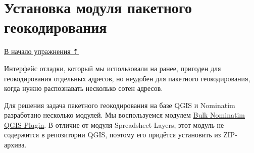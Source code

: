 \documentclass[
  12pt,
]{book}
\begin{document}
\hypertarget{geocoding-batch-install}{%
\section{Установка модуля пакетного геокодирования}\label{geocoding-batch-install}}

\protect\hyperlink{geocoding}{В начало упражнения ⇡}

Интерфейс отладки, который мы использовали на ранее, пригоден для геокодирования отдельных адресов, но неудобен для пакетного геокодирования, когда нужно распознавать несколько сотен адресов.

Для решения задача пакетного геокодирования на базе QGIS и Nominatim разработано несколько модулей. Мы воспользуемся модулем \href{https://github.com/NationalSecurityAgency/qgis-bulk-nominatim}{Bulk Nominatim QGIS Plugin}. В отличие от модуля Spreadsheet Layers, этот модуль не содержится в репозитории QGIS, поэтому его придётся установить из ZIP-архива.
\end{document}
